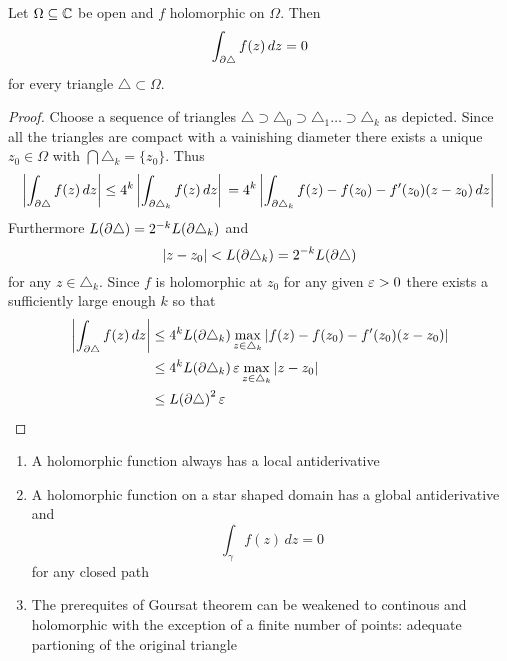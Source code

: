 \begin{theorem}[Goursat]\label{thm:thm_goursat}
	Let \( \Omega \subseteq \mathbb{C} \) be open and \( f \) holomorphic on \( \Omega \).
	Then
	\[
		\int_{\partial\triangle} f(z)\,dz = 0
	\]
	for every triangle \( \triangle \subset \Omega \).
\end{theorem}

\begin{proof}
	Choose a sequence of triangles \( \triangle \supset \triangle_0 \supset \triangle_1 \dots \supset \triangle_k \)
	as depicted. Since all the triangles are compact with a vainishing diameter there exists a unique \( z_0 \in \Omega \) with \( \bigcap \triangle_k = \{ z_0 \}  \). Thus
	\[
		\left| \int_{\partial\triangle} f(z)\,dz \right|
		\le 4^k \left| \int_{\partial\triangle_k} f(z)\,dz \right| \\
		= 4^k \left| \int_{\partial\triangle_k} f(z) - f(z_0) - f'(z_0)(z - z_0)\,dz \right| \\
	\]
	Furthermore \( L(\partial\triangle) = 2^{-k} L(\partial\triangle_k) \) and
	\[
		|z - z_0| < L(\partial\triangle_k) = 2^{-k} L(\partial\triangle)
	\]
	for any \( z \in \triangle_k \). Since \( f \) is holomorphic at \( z_0 \) for any given \( \varepsilon > 0 \)
	there exists a sufficiently large enough \( k \) so that
	\[
		\begin{split}
			\left| \int_{\partial\triangle} f(z)\,dz \right|
			& \le 4^k L(\partial\triangle_k) \max_{z \in \triangle_k} |f(z) - f(z_0) - f'(z_0)(z - z_0)| \\
			& \le 4^k L(\partial\triangle_k) \,\varepsilon \max_{z \in \triangle_k} |z - z_0| \\
			& \le {L(\partial\triangle)}^2 \,\varepsilon
		\end{split}
	\]
\end{proof}
\bigskip


\begin{corollary}\hfill
	\begin{enumerate}
		\item A holomorphic function always has a local antiderivative
		\item A holomorphic function on a star shaped domain has a global antiderivative and
		      \[
			      \int_{\gamma} f(z)\,dz = 0
		      \]
		      for any closed path
		\item The prerequites of Goursat theorem can be weakened to continous and holomorphic with
		      the exception of a finite number of points: adequate partioning of the original triangle
	\end{enumerate}
\end{corollary}
\bigskip


